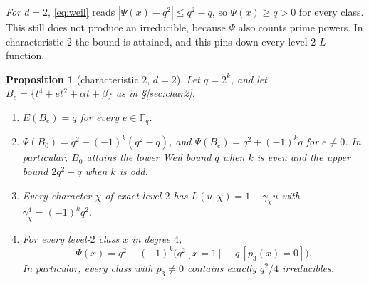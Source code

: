 \documentclass[11pt,a4paper]{amsart}
\newtheorem{proposition}[theorem]{Proposition}
\theoremstyle{definition}
\theoremstyle{remark}
\newcommand{\F}{\mathbb{F}}
\begin{document}
\emph{For $d=2$}, \eqref{eq:weil} reads $|\Psi(x)-q^2|\le q^2-q$, so $\Psi(x)\ge q>0$ for every class. This still
does not produce an irreducible, because $\Psi$ also counts prime powers. In characteristic $2$ the bound is attained,
and this pins down every level-$2$ $L$-function.

\begin{proposition}[characteristic $2$, $d=2$]\label{prop:rigid}
Let $q=2^k$, and let $B_e=\{t^4+et^2+\alpha t+\beta\}$ as in \S\ref{sec:char2}.
\begin{enumerate}
\item $E(B_e)=q$ for every $e\in\F_q$.
\item $\Psi(B_0)=q^2-(-1)^k(q^2-q)$, and $\Psi(B_e)=q^2+(-1)^kq$ for $e\ne0$. In particular, $B_0$ attains the lower
Weil bound $q$ when $k$ is even and the upper bound $2q^2-q$ when $k$ is odd.
\item Every character $\chi$ of exact level $2$ has $L(u,\chi)=1-\gamma_\chi u$ with $\gamma_\chi^4=(-1)^kq^2$.
\item For every level-$2$ class $x$ in degree $4$,
\[
\Psi(x)=q^2-(-1)^k\bigl(q^2[x=1]-q\,[p_3(x)=0]\bigr).
\]
In particular, every class with $p_3\ne0$ contains exactly $q^2/4$ irreducibles.
\end{enumerate}
\end{proposition}
\end{document}
